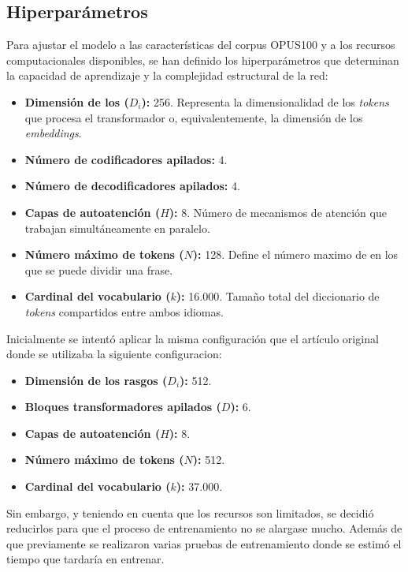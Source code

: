 \subsection{Hiperparámetros}

Para ajustar el modelo a las características del corpus OPUS100 y a los recursos computacionales disponibles, se han definido los 
hiperparámetros que determinan la capacidad de aprendizaje y la complejidad estructural de la red:

\begin{itemize}
    \item \textbf{Dimensión de los \tokens{} ($D_i$):} 256. Representa la dimensionalidad de los \textit{tokens} que procesa el transformador o, 
    equivalentemente, la dimensión de los \textit{embeddings}.
    \item \textbf{Número de codificadores apilados:} 4.
    \item \textbf{Número de decodificadores apilados:} 4.
    \item \textbf{Capas de autoatención ($H$):} 8. Número de mecanismos de atención que trabajan simultáneamente en paralelo.
    \item \textbf{Número máximo de tokens ($N$):} 128. Define el número maximo de \tokens{} en los que se puede dividir una frase.
    \item \textbf{Cardinal del vocabulario ($k$):} 16.000. Tamaño total del diccionario de \textit{tokens} compartidos entre ambos idiomas.

\end{itemize}

Inicialmente se intentó aplicar la misma configuración que el artículo original 
\cite{vaswani2017attention_arxiv} donde se utilizaba la siguiente configuracion:
\begin{itemize}
    \item \textbf{Dimensión de los rasgos ($D_i$):} 512. 
    \item \textbf{Bloques transformadores apilados ($D$):} 6.
    \item \textbf{Capas de autoatención ($H$):} 8.
    \item \textbf{Número máximo de tokens ($N$):} 512.
    \item \textbf{Cardinal del vocabulario ($k$):} 37.000.
\end{itemize}

Sin embargo, y teniendo en cuenta que los recursos son limitados, se decidió reducirlos para que el proceso de entrenamiento no se alargase mucho. 
Además de que previamente se realizaron varias pruebas de entrenamiento donde se estimó el tiempo que tardaría en entrenar. 

